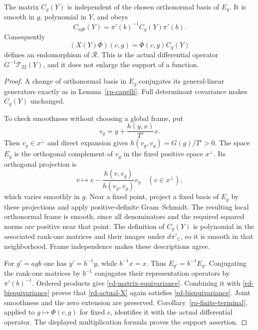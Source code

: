 \begin{lemma}\label{rd-smooth-matrix}
The matrix $C_g(Y)$ is independent of the chosen
orthonormal basis of $E_g$.  It is smooth in $g$,
polynomial in $Y$, and obeys
\begin{equation}\label{rd-matrix-equivariance}
 C_{agb}(Y)=\pi'(b)^{-1}C_g(Y)\pi'(b).
\end{equation}
Consequently
\begin{equation}\label{rd-actual-X}
             (X(Y)\Phi)(c,g)=\Phi(c,g)C_g(Y)
\end{equation}
defines an endomorphism of $\mathscr R$.  This is the
actual differential operator
$G^{-1}\mathcal T_{22}(Y)$, and it does not enlarge
the support of a function.
\end{lemma}

\begin{proof}
A change of orthonormal basis in $E_g$ conjugates its
general-linear generators exactly as in
Lemma~\ref{rp-capelli}.  Full determinant covariance
makes $C_g(Y)$ unchanged.

To check smoothness without choosing a global frame,
put
\[
 v_g=y+\frac{h(y,x)}{T'}x.
\]
Then $v_g\in x^\perp$ and direct expansion gives
$h(v_g,v_g)=G(g)/T'>0$.  The space $E_g$ is the
orthogonal complement of $v_g$ in the fixed positive
space $x^\perp$.  Its orthogonal projection is
\[
       v\longmapsto v-\frac{h(v,v_g)}{h(v_g,v_g)}v_g
                                      \quad(v\in x^\perp),
\]
which varies smoothly in $g$.  Near a fixed point,
project a fixed basis of $E_g$ by these projections
and apply positive-definite Gram--Schmidt.  The
resulting local orthonormal frame is smooth, since
all denominators and the required squared norms
are positive near that point.  The definition of
$C_g(Y)$ is polynomial in the associated rank-one
matrices and their images under $d\pi'_{\mathbb C}$,
so it is smooth in that neighborhood.  Frame
independence makes these descriptions agree.

For $g'=agb$ one has $y'=b^{-1}y$, while
$b^{-1}x=x$.  Thus $E_{g'}=b^{-1}E_g$.
Conjugating the rank-one matrices by $b^{-1}$
conjugates their representation operators by
$\pi'(b)^{-1}$.  Ordered products give
\eqref{rd-matrix-equivariance}.
Combining it with \eqref{rd-biequivariance} proves
that \eqref{rd-actual-X} again satisfies
\eqref{rd-biequivariance}.  Joint smoothness and
the zero extension are preserved.
Corollary~\ref{rp-finite-terminal}, applied to
$g\mapsto\Phi(c,g)$ for fixed $c$, identifies it
with the actual differential operator.  The
displayed multiplication formula proves the
support assertion.
\end{proof}


